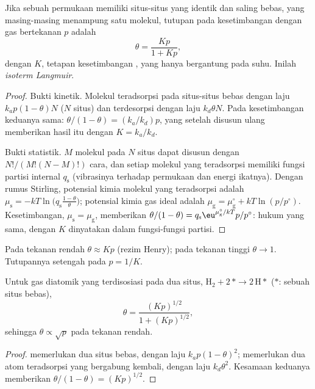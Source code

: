 \begin{theorem}\label{thm:b3:surfaces-catalysis:langmuir}
Jika sebuah permukaan memiliki situs-situs yang identik dan saling bebas, yang
masing-masing menampung satu molekul, tutupan pada kesetimbangan dengan gas
bertekanan $p$ adalah
\[
  \theta = \frac{Kp}{1 + Kp},
\]
dengan $K$, tetapan kesetimbangan , yang hanya bergantung pada suhu.
Inilah \emph{isoterm Langmuir}.
\end{theorem}

\begin{proof}
Bukti kinetik. Molekul teradsorpsi pada situs-situs bebas dengan laju $k_ap(1 - \theta)N$ ($N$
situs) dan terdesorpsi dengan laju $k_d\theta N$. Pada kesetimbangan keduanya sama: $\theta/(1 - \theta)
= (k_a/k_d)p$, yang setelah disusun ulang memberikan hasil itu dengan $K = k_a/k_d$.

Bukti statistik. $M$ molekul pada $N$ situs dapat disusun dengan $N!/(M!(N - M)!)$ cara,
dan setiap molekul yang teradsorpsi memiliki fungsi partisi internal $q_{\mathrm s}$
(vibrasinya terhadap permukaan dan energi ikatnya). Dengan rumus Stirling,
potensial kimia molekul yang teradsorpsi adalah $\mu_{\mathrm s} = -kT\ln\bigl(q_{\mathrm s}\frac{1 - \theta}{\theta}\bigr)$;
potensial kimia gas ideal adalah $\mu_{\mathrm g} = \mu_{\mathrm g}^\circ + kT\ln(p/p^\circ)$. Kesetimbangan, $\mu_{\mathrm s} = \mu_{\mathrm g}$, memberikan
$\theta/(1 - \theta) = q_{\mathrm s}\eu^{\mu_{\mathrm g}^\circ/kT}p/p^\circ$: hukum yang sama, dengan $K$ dinyatakan dalam
fungsi-fungsi partisi.
\end{proof}

Pada tekanan rendah $\theta \approx Kp$ (rezim Henry); pada tekanan tinggi $\theta \to 1$.
Tutupannya setengah pada $p = 1/K$.

\begin{proposition}\label{prop:b3:surfaces-catalysis:dissociative}
Untuk gas diatomik yang terdisosiasi pada dua situs, $\mathrm{H_2} + 2\,{*} \to 2\,\mathrm{H}{*}$ (${*}$: sebuah situs bebas),
\[
  \theta = \frac{(Kp)^{1/2}}{1 + (Kp)^{1/2}},
\]
sehingga $\theta \propto \sqrt p$ pada tekanan rendah.
\end{proposition}

\begin{proof}
 memerlukan dua situs bebas, dengan laju $k_ap(1 - \theta)^2$;  memerlukan dua
atom teradsorpsi yang bergabung kembali, dengan laju $k_d\theta^2$. Kesamaan keduanya memberikan $\theta/(1 - \theta) =
(Kp)^{1/2}$.
\end{proof}

